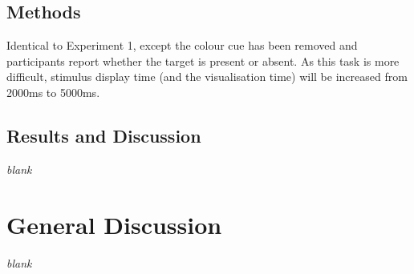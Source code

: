 \documentclass[smallextended]{svjour3}       %
\begin{document}
\subsection{Methods}

Identical to Experiment 1, except the colour cue has been removed and participants report whether the target is present or absent. As this task is more difficult, stimulus display time (and the visualisation time) will be increased from 2000ms to 5000ms. 

\subsection{Results and Discussion}


\centering
\textit{blank}

\section{General Discussion}
\label{sec:discussion}

\centering
\textit{blank}






\end{document}
